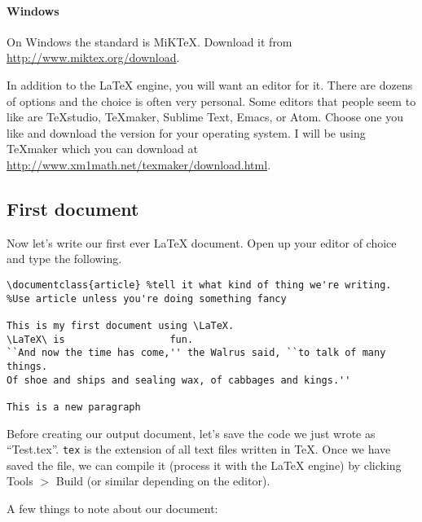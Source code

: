 \paragraph{Windows} On Windows the standard is MiK\TeX{}. Download it from \url{http://www.miktex.org/download}.

In addition to the \LaTeX{} engine, you will want an editor for it. There are dozens of options and the choice is often very personal.  Some editors that people seem to like are \TeX{}studio, \TeX{}maker, Sublime Text, Emacs, or Atom. Choose one you like and download the version for your operating system. I will be using \TeX{}maker which you can download at \url{http://www.xm1math.net/texmaker/download.html}.

\subsection{First document}

Now let's write our first ever \LaTeX{} document. Open up your editor of choice and type the following.

\begin{lstlisting}
\documentclass{article} %tell it what kind of thing we're writing.
%Use article unless you're doing something fancy

This is my first document using \LaTeX.
\LaTeX\ is                  fun.
``And now the time has come,'' the Walrus said, ``to talk of many things.
Of shoe and ships and sealing wax, of cabbages and kings.''

This is a new paragraph

\end{lstlisting}

Before creating our output document, let's save the code we just wrote as ``Test.tex''. \texttt{tex} is the extension of all text files written in \TeX{}. Once we have saved the file, we can compile it (process it with the \LaTeX{} engine) by clicking Tools $>$ Build (or similar depending on the editor).

A few things to note about our document:

